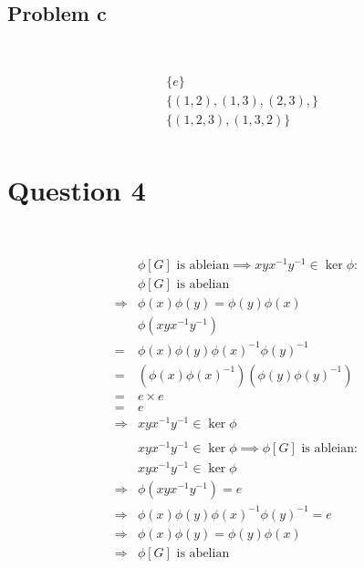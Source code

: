 \documentclass{article}
\begin{document}
~

\subsection*{Problem c}

~

\begin{equation*}
    \begin{split}
        &\{e\}\\
        &\{(1,2),(1,3),(2,3),\}\\
        &\{(1,2,3),(1,3,2)\}\\
    \end{split}
\end{equation*}

\newpage

\section*{Question 4}

~

\begin{equation*}
    \begin{split}
        &\phi[G]\text{ is ableian}\implies xyx^{-1}y^{-1}\in\ker\phi:\\
        &\phi[G]\text{ is abelian}\\
        \Rightarrow&\phi(x)\phi(y)=\phi(y)\phi(x)\\
        &\phi(xyx^{-1}y^{-1})\\
        =&\phi(x)\phi(y)\phi(x)^{-1}\phi(y)^{-1}\\
        =&(\phi(x)\phi(x)^{-1})(\phi(y)\phi(y)^{-1})\\
        =&e\times e\\
        =&e\\
        \Rightarrow&xyx^{-1}y^{-1}\in\ker\phi\\
        &\\
        &xyx^{-1}y^{-1}\in\ker\phi\implies\phi[G]\text{ is ableian}:\\
        &xyx^{-1}y^{-1}\in\ker\phi\\
        \Rightarrow&\phi(xyx^{-1}y^{-1})=e\\
        \Rightarrow&\phi(x)\phi(y)\phi(x)^{-1}\phi(y)^{-1}=e\\
        \Rightarrow&\phi(x)\phi(y)=\phi(y)\phi(x)\\
        \Rightarrow&\phi[G]\text{ is abelian}\\
    \end{split}
\end{equation*}
\end{document}

